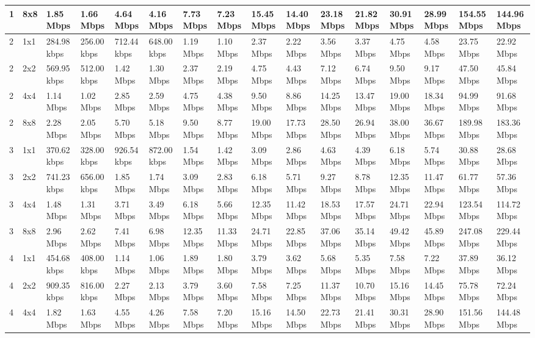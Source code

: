 \documentclass[12pt]{article}
\begin{document}
\begin{longtable}[c]{|l|l|l|l|l|l|l|l|l|l|l|l|l|l|l|l|}
1 & 8x8 & 1.85 Mbps & 1.66 Mbps & 4.64 Mbps & 4.16 Mbps & 7.73 Mbps & 7.23 Mbps & 15.45 Mbps & 14.40 Mbps & 23.18 Mbps & 21.82 Mbps & 30.91 Mbps & 28.99 Mbps & 154.55 Mbps & 144.96 Mbps \\ \hline
2 & 1x1 & 284.98 kbps & 256.00 kbps & 712.44 kbps & 648.00 kbps & 1.19 Mbps & 1.10 Mbps & 2.37 Mbps & 2.22 Mbps & 3.56 Mbps & 3.37 Mbps & 4.75 Mbps & 4.58 Mbps & 23.75 Mbps & 22.92 Mbps \\ \hline
2 & 2x2 & 569.95 kbps & 512.00 kbps & 1.42 Mbps & 1.30 Mbps & 2.37 Mbps & 2.19 Mbps & 4.75 Mbps & 4.43 Mbps & 7.12 Mbps & 6.74 Mbps & 9.50 Mbps & 9.17 Mbps & 47.50 Mbps & 45.84 Mbps \\ \hline
2 & 4x4 & 1.14 Mbps & 1.02 Mbps & 2.85 Mbps & 2.59 Mbps & 4.75 Mbps & 4.38 Mbps & 9.50 Mbps & 8.86 Mbps & 14.25 Mbps & 13.47 Mbps & 19.00 Mbps & 18.34 Mbps & 94.99 Mbps & 91.68 Mbps \\ \hline
2 & 8x8 & 2.28 Mbps & 2.05 Mbps & 5.70 Mbps & 5.18 Mbps & 9.50 Mbps & 8.77 Mbps & 19.00 Mbps & 17.73 Mbps & 28.50 Mbps & 26.94 Mbps & 38.00 Mbps & 36.67 Mbps & 189.98 Mbps & 183.36 Mbps \\ \hline
3 & 1x1 & 370.62 kbps & 328.00 kbps & 926.54 kbps & 872.00 kbps & 1.54 Mbps & 1.42 Mbps & 3.09 Mbps & 2.86 Mbps & 4.63 Mbps & 4.39 Mbps & 6.18 Mbps & 5.74 Mbps & 30.88 Mbps & 28.68 Mbps \\ \hline
3 & 2x2 & 741.23 kbps & 656.00 kbps & 1.85 Mbps & 1.74 Mbps & 3.09 Mbps & 2.83 Mbps & 6.18 Mbps & 5.71 Mbps & 9.27 Mbps & 8.78 Mbps & 12.35 Mbps & 11.47 Mbps & 61.77 Mbps & 57.36 Mbps \\ \hline
3 & 4x4 & 1.48 Mbps & 1.31 Mbps & 3.71 Mbps & 3.49 Mbps & 6.18 Mbps & 5.66 Mbps & 12.35 Mbps & 11.42 Mbps & 18.53 Mbps & 17.57 Mbps & 24.71 Mbps & 22.94 Mbps & 123.54 Mbps & 114.72 Mbps \\ \hline
3 & 8x8 & 2.96 Mbps & 2.62 Mbps & 7.41 Mbps & 6.98 Mbps & 12.35 Mbps & 11.33 Mbps & 24.71 Mbps & 22.85 Mbps & 37.06 Mbps & 35.14 Mbps & 49.42 Mbps & 45.89 Mbps & 247.08 Mbps & 229.44 Mbps \\ \hline
4 & 1x1 & 454.68 kbps & 408.00 kbps & 1.14 Mbps & 1.06 Mbps & 1.89 Mbps & 1.80 Mbps & 3.79 Mbps & 3.62 Mbps & 5.68 Mbps & 5.35 Mbps & 7.58 Mbps & 7.22 Mbps & 37.89 Mbps & 36.12 Mbps \\ \hline
4 & 2x2 & 909.35 kbps & 816.00 kbps & 2.27 Mbps & 2.13 Mbps & 3.79 Mbps & 3.60 Mbps & 7.58 Mbps & 7.25 Mbps & 11.37 Mbps & 10.70 Mbps & 15.16 Mbps & 14.45 Mbps & 75.78 Mbps & 72.24 Mbps \\ \hline
4 & 4x4 & 1.82 Mbps & 1.63 Mbps & 4.55 Mbps & 4.26 Mbps & 7.58 Mbps & 7.20 Mbps & 15.16 Mbps & 14.50 Mbps & 22.73 Mbps & 21.41 Mbps & 30.31 Mbps & 28.90 Mbps & 151.56 Mbps & 144.48 Mbps \\ \hline

\end{longtable}
\end{document}
